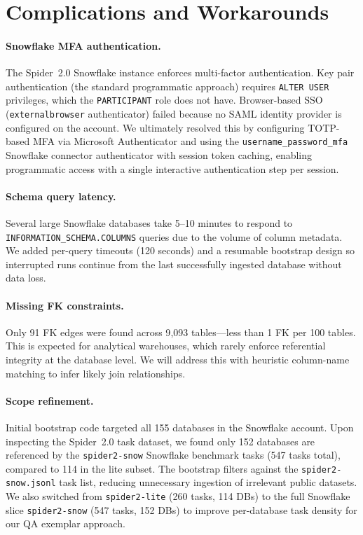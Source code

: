 \documentclass[11pt]{article}
\begin{document}
\section{Complications and Workarounds}

\paragraph{Snowflake MFA authentication.}
The Spider~2.0 Snowflake instance enforces multi-factor authentication.
Key pair authentication (the standard programmatic approach) requires \texttt{ALTER USER} privileges, which the \texttt{PARTICIPANT} role does not have.
Browser-based SSO (\texttt{externalbrowser} authenticator) failed because no SAML identity provider is configured on the account.
We ultimately resolved this by configuring TOTP-based MFA via Microsoft Authenticator and using the \texttt{username\_password\_mfa} Snowflake connector authenticator with session token caching, enabling programmatic access with a single interactive authentication step per session.

\paragraph{Schema query latency.}
Several large Snowflake databases take 5--10 minutes to respond to \texttt{INFORMATION\_SCHEMA.COLUMNS} queries due to the volume of column metadata.
We added per-query timeouts (120 seconds) and a resumable bootstrap design so interrupted runs continue from the last successfully ingested database without data loss.

\paragraph{Missing FK constraints.}
Only 91 FK edges were found across 9{,}093 tables---less than 1 FK per 100 tables.
This is expected for analytical warehouses, which rarely enforce referential integrity at the database level.
We will address this with heuristic column-name matching to infer likely join relationships.

\paragraph{Scope refinement.}
Initial bootstrap code targeted all 155 databases in the Snowflake account.
Upon inspecting the Spider~2.0 task dataset, we found only 152 databases are referenced by the \texttt{spider2-snow} Snowflake benchmark tasks (547 tasks total), compared to 114 in the lite subset.
The bootstrap filters against the \texttt{spider2-snow.jsonl} task list, reducing unnecessary ingestion of irrelevant public datasets.
We also switched from \texttt{spider2-lite} (260 tasks, 114 DBs) to the full Snowflake slice \texttt{spider2-snow} (547 tasks, 152 DBs) to improve per-database task density for our QA exemplar approach.
\end{document}
